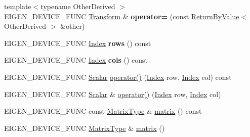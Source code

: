 \begin{DoxyCompactItemize}
\item 
\mbox{\label{class_eigen_1_1_transform_a8277e6d0830ef5804b1ead00b14b0c9d}} 
{\footnotesize template$<$typename Other\+Derived $>$ }\\E\+I\+G\+E\+N\+\_\+\+D\+E\+V\+I\+C\+E\+\_\+\+F\+U\+NC \mbox{\hyperlink{class_eigen_1_1_transform}{Transform}} \& {\bfseries operator=} (const \mbox{\hyperlink{class_eigen_1_1_return_by_value}{Return\+By\+Value}}$<$ Other\+Derived $>$ \&other)
\item 
\mbox{\label{class_eigen_1_1_transform_ac27cda9806c29f4d022198bbbdeb9a91}} 
E\+I\+G\+E\+N\+\_\+\+D\+E\+V\+I\+C\+E\+\_\+\+F\+U\+NC \mbox{\hyperlink{class_eigen_1_1_transform_a49df3689ac2b736bcb564dec47d6486c}{Index}} {\bfseries rows} () const
\item 
\mbox{\label{class_eigen_1_1_transform_aaf5a748164ab58f3d9c894daccdb7fbb}} 
E\+I\+G\+E\+N\+\_\+\+D\+E\+V\+I\+C\+E\+\_\+\+F\+U\+NC \mbox{\hyperlink{class_eigen_1_1_transform_a49df3689ac2b736bcb564dec47d6486c}{Index}} {\bfseries cols} () const
\item 
E\+I\+G\+E\+N\+\_\+\+D\+E\+V\+I\+C\+E\+\_\+\+F\+U\+NC \mbox{\hyperlink{class_eigen_1_1_transform_a4e69ced9d651745b8ed4eda46f41795d}{Scalar}} \mbox{\hyperlink{class_eigen_1_1_transform_aa0a930a85c51566fe06d281da85d1a4a}{operator()}} (\mbox{\hyperlink{class_eigen_1_1_transform_a49df3689ac2b736bcb564dec47d6486c}{Index}} row, \mbox{\hyperlink{class_eigen_1_1_transform_a49df3689ac2b736bcb564dec47d6486c}{Index}} col) const
\item 
E\+I\+G\+E\+N\+\_\+\+D\+E\+V\+I\+C\+E\+\_\+\+F\+U\+NC \mbox{\hyperlink{class_eigen_1_1_transform_a4e69ced9d651745b8ed4eda46f41795d}{Scalar}} \& \mbox{\hyperlink{class_eigen_1_1_transform_ab66b426ef3ebf955d4f925cbcee34293}{operator()}} (\mbox{\hyperlink{class_eigen_1_1_transform_a49df3689ac2b736bcb564dec47d6486c}{Index}} row, \mbox{\hyperlink{class_eigen_1_1_transform_a49df3689ac2b736bcb564dec47d6486c}{Index}} col)
\item 
E\+I\+G\+E\+N\+\_\+\+D\+E\+V\+I\+C\+E\+\_\+\+F\+U\+NC const \mbox{\hyperlink{class_eigen_1_1_transform_a30f72ba46abc2bb3c7fa919c1078fc9c}{Matrix\+Type}} \& \mbox{\hyperlink{class_eigen_1_1_transform_aec8168000a88a807130d41020af98d47}{matrix}} () const
\item 
E\+I\+G\+E\+N\+\_\+\+D\+E\+V\+I\+C\+E\+\_\+\+F\+U\+NC \mbox{\hyperlink{class_eigen_1_1_transform_a30f72ba46abc2bb3c7fa919c1078fc9c}{Matrix\+Type}} \& \mbox{\hyperlink{class_eigen_1_1_transform_aee6c4863933d3660e56e3333e0506cc2}{matrix}} ()

\end{DoxyCompactItemize}
